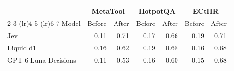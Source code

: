 \begin{tabular}{lrrrrrr}
\toprule
 & \multicolumn{2}{c}{MetaTool} & \multicolumn{2}{c}{HotpotQA} & \multicolumn{2}{c}{ECtHR} \\
\cmidrule(lr){2-3} \cmidrule(lr){4-5} \cmidrule(lr){6-7}
Model & Before & After & Before & After & Before & After \\
\midrule
Jev & 0.11 & 0.71 & 0.17 & 0.66 & 0.19 & 0.71 \\
Liquid d1 & 0.16 & 0.62 & 0.19 & 0.68 & 0.16 & 0.68 \\
GPT-6 Luna Decisions & 0.11 & 0.53 & 0.16 & 0.60 & 0.15 & 0.68 \\
\bottomrule
\end{tabular}
